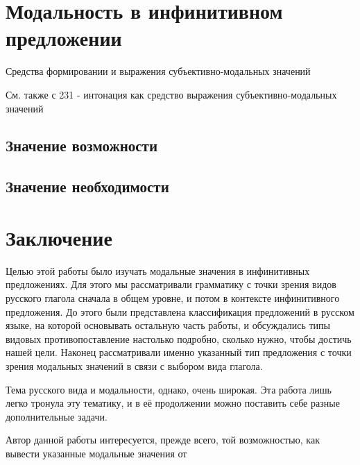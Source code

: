 \documentclass{article}
\begin{document}
\section{Модальность в инфинитивном предложении}

Средства формировании и выражения субъективно-модальных значений

См. также с 231 - интонация как средство выражения субъективно-модальных значений

\subsection{Значение возможности}
\subsection{Значение необходимости}

\section{Заключение}

Целью этой работы было изучать модальные значения в инфинитивных предложениях. Для этого мы рассматривали грамматику с точки зрения видов русского глагола сначала в общем уровне, и потом в контексте инфинитивного предложения. До этого были представлена классификация предложений в русском языке, на которой основывать остальную часть работы, и обсуждались типы видовых противопоставление настолько подробно, сколько нужно, чтобы достичь нашей цели. Наконец рассматривали именно указанный тип предложения с точки зрения модальных значений в связи с выбором вида глагола.

Тема русского вида и модальности, однако, очень широкая. Эта работа лишь легко тронула эту тематику, и в её продолжении можно поставить себе разные дополнительные задачи. 

Автор данной работы интересуется, прежде всего, той возможностью, как вывести указанные модальные значения от 






\printbibliography[heading=bibintoc,title={Список использоваемой литературы}]


%
%
\end{document}
